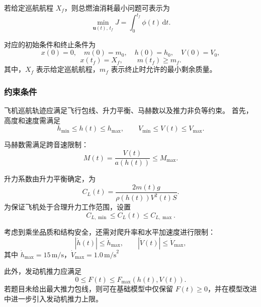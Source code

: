 \documentclass[UTF8]{ctexart}
\begin{document}
若给定巡航航程 $X_f$，则总燃油消耗最小问题可表示为
\begin{equation}
    \min_{\boldsymbol{u}(t),\,t_f}
    J
    =
    \int_{0}^{t_f}\phi(t)\,\mathrm{d}t.
    \label{eq:q3_objective}
\end{equation}

对应的初始条件和终止条件为
\begin{equation}
    x(0)=0,\quad m(0)=m_0,\quad h(0)=h_0,\quad V(0)=V_0,
    \label{eq:q3_initial}
\end{equation}
\begin{equation}
    x(t_f)=X_f,\qquad m(t_f)\geq m_f.
    \label{eq:q3_terminal}
\end{equation}
其中，$X_f$ 表示给定巡航航程，$m_f$ 表示终止时允许的最小剩余质量。

\subsubsection{约束条件}

飞机巡航轨迹应满足飞行包线、升力平衡、马赫数以及推力非负等约束。
首先，高度和速度需满足
\begin{equation}
    h_{\min}\leq h(t)\leq h_{\max},
    \qquad
    V_{\min}\leq V(t)\leq V_{\max}.
    \label{eq:q3_hV_bounds}
\end{equation}

马赫数需满足跨音速限制：
\begin{equation}
    M(t)=\frac{V(t)}{a(h(t))}\leq M_{\max}.
    \label{eq:q3_mach_constraint}
\end{equation}

升力系数由升力平衡确定，为
\begin{equation}
    C_L(t)=\frac{2m(t)g}{\rho(h(t))V^2(t)S}.
    \label{eq:q3_CL}
\end{equation}
为保证飞机处于合理升力工作范围，设置
\begin{equation}
    C_{L,\min}\leq C_L(t)\leq C_{L,\max}.
    \label{eq:q3_CL_bounds}
\end{equation}

考虑到乘坐品质和结构安全，还需对爬升率和水平加速度进行限制：
\begin{equation}
    |\dot h(t)| \leq \dot h_{\max}, \qquad |\dot V(t)| \leq \dot V_{\max},
\end{equation}
其中 $\dot h_{\max}=15\,\text{m/s}$，$\dot V_{\max}=1.0\,\text{m/s}^2$

此外，发动机推力应满足
\begin{equation}
    0\leq F(t)\leq F_{\max}(h(t),V(t)).
    \label{eq:q3_thrust_constraint}
\end{equation}
若题目未给出最大推力包线，则可在基础模型中仅保留 $F(t)\geq0$，并在模型改进中进一步引入发动机推力上限。
\end{document}
